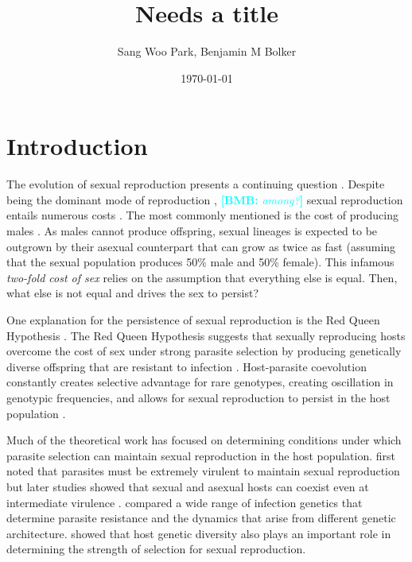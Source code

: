 \documentclass{article}\usepackage[]{graphicx}\usepackage[]{color}
\title{Needs a title}
\author{Sang Woo Park, Benjamin M Bolker}
\date{\today}
\newcommand{\comment}[3]{\textcolor{#1}{\textbf{[#2: }\textit{#3}\textbf{]}}}
\newcommand{\bmb}[1]{\comment{cyan}{BMB}{#1}}
\begin{document}
\maketitle

\section{Introduction}

The evolution of sexual reproduction presents a continuing question \citep{otto2009evolutionary}.
Despite being the dominant mode of reproduction \citep{vrijenhoek1998animal}, \bmb{among?} sexual reproduction entails numerous costs \citep{lehtonen2012many}.
The most commonly mentioned is the cost of producing males \citep{smith1978evolution}.
As males cannot produce offspring, sexual lineages is expected to be outgrown by their asexual counterpart that can grow as twice as fast (assuming that the sexual population produces 50\% male and 50\% female).
This infamous \emph{two-fold cost of sex} \citep{smith1978evolution} relies on the assumption that everything else is equal.
Then, what else is not equal and drives the sex to persist?

One explanation for the persistence of sexual reproduction is the Red Queen Hypothesis \citep{bell1982masterpiece}.
The Red Queen Hypothesis suggests that sexually reproducing hosts overcome the cost of sex under strong parasite selection by producing genetically diverse offspring that are resistant to infection \citep{jbs1949disease, jaenike1978hypothesis, hamilton1980sex}.
Host-parasite coevolution constantly creates selective advantage for rare genotypes, creating oscillation in genotypic frequencies, and allows for sexual reproduction to persist in the host population \citep{clarke1976ecological, hamilton1980sex}.

Much of the theoretical work has focused on determining conditions under which parasite selection can maintain sexual reproduction in the host population.
\cite{may1983epidemiology} first noted that parasites must be extremely virulent to maintain sexual reproduction but later studies showed that sexual and asexual hosts can coexist even at intermediate virulence \citep{howard1994parasitism}.
\cite{agrawal2002infection} compared a wide range of infection genetics that determine parasite resistance and the dynamics that arise from different genetic architecture.
\cite{ashby2015diversity} showed that host genetic diversity also plays an important role in determining the strength of selection for sexual reproduction.
\end{document}
